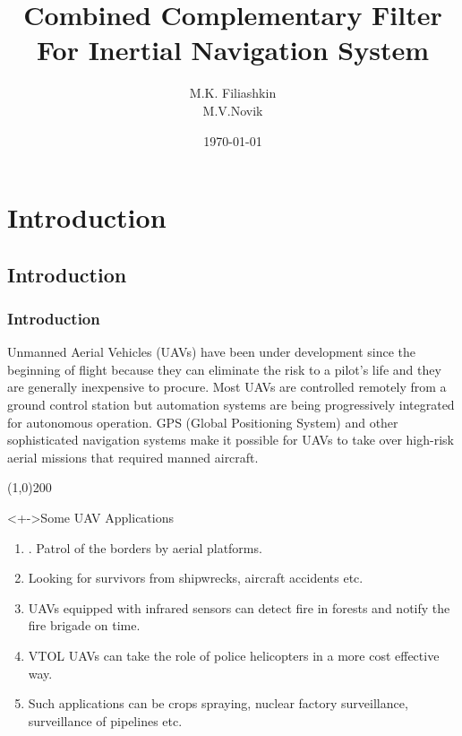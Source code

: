 \documentclass[compress]{beamer}    %
\begin{document}
\title{Combined Complementary Filter For Inertial Navigation System}  
\author{M.K. Filiashkin \\ M.V.Novik}
\date{\today} 
\begin{frame}
\titlepage
\end{frame}

\section{Introduction} 
\subsection{Introduction} 
\begin{frame}\frametitle{Introduction}
{\tiny
Unmanned Aerial Vehicles (UAVs) have been under development since the beginning of flight
because they can eliminate the risk to a pilot’s life and they are generally inexpensive to procure.
Most UAVs are controlled remotely from a ground control station but automation systems are
being progressively integrated for autonomous operation. GPS (Global Positioning System) and
other sophisticated navigation systems make it possible for UAVs to take over high-risk aerial
missions that required manned aircraft.}

\centering \line(1,0){200}

\begin{block}<+->{Some UAV Applications}
\tiny
\begin{enumerate}
\item  {}. Patrol of the borders by aerial platforms.
\item  {} Looking for survivors from shipwrecks, aircraft accidents etc.

\item  {} UAVs equipped with infrared sensors can detect fire in
forests and notify the fire brigade on time.

\item {} VTOL UAVs can take
the role of police helicopters in a more
cost effective way.

\item {} Such
applications can be crops spraying,
nuclear factory surveillance, surveillance
of pipelines etc.

\end{enumerate}
\end{block}

\end{frame} 
\end{document}
